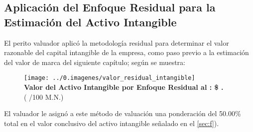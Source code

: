 \subsection{Aplicaci\'on del Enfoque Residual para la Estimaci\'on del Activo Intangible}

El perito valuador aplic\'o la metodolog\'ia residual para determinar el valor razonable del capital intangible de la empresa, como paso previo a la estimaci\'on del valor de marca del siguiente cap\'itulo; seg\'un se muestra:\\

\begin{figure}[H]
\centering
\texttt{[image: ../0.imagenes/valor\_residual\_intangible]}\\[10pt]


\textcolor{principal}{\textbf{Valor del Activo Intangible por Enfoque Residual al \fechaValoresCorto: \$\valorResidual{} \monedaCode.}}\\
(\textcolor{principal}{\valorResidualLetra{} /100 M.N.})

\end{figure}


El valuador le asign\'o a este m\'etodo de valuaci\'on una ponderaci\'on del 50.00\% total en el valor conclusivo del activo intangible se\~nalado en el \autoref{sec:f}).
